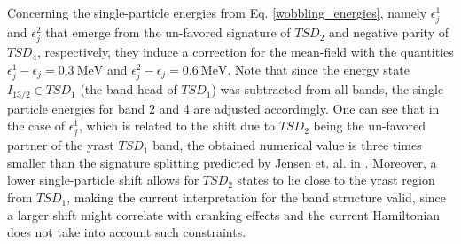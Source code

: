 \documentclass[11pt]{article}
\begin{document}
Concerning the single-particle energies from Eq. \ref{wobbling_energies}, namely $\epsilon_j^1$ and $\epsilon_j^2$ that emerge from the un-favored signature of $TSD_2$ and negative parity of $TSD_4$, respectively, they induce a correction for the mean-field with the quantities $\epsilon_j^1-\epsilon_j=0.3\ \text{MeV}$ and $\epsilon_j^2-\epsilon_j=0.6\ \text{MeV}$. Note that since the energy state $I_{13/2}\in TSD_1$ (the band-head of $TSD_1$) was subtracted from all bands, the single-particle energies for band 2 and 4 are adjusted accordingly. One can see that in the case of $\epsilon_j^1$, which is related to the shift due to $TSD_2$ being the un-favored partner of the yrast $TSD_1$ band, the obtained numerical value is three times smaller than the signature splitting predicted by Jensen et. al. in \cite{jensen2002wobbling}. Moreover, a lower single-particle shift allows for $TSD_2$ states to lie close to the yrast region from $TSD_1$, making the current interpretation for the band structure valid, since a larger shift might correlate with cranking effects and the current Hamiltonian does not take into account such constraints.
\end{document}
